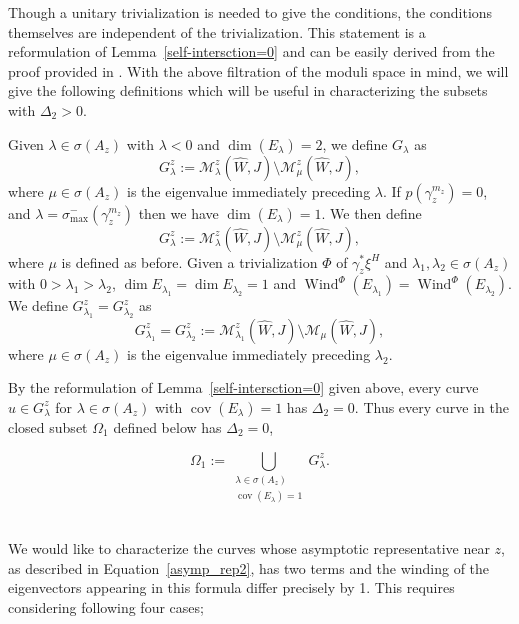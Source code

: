 \documentclass[11pt, a4paper]{amsart}
\newcommand{\cM}{\mathcal{M}}
\DeclareMathOperator{\wind}{Wind}
\DeclareMathOperator{\cov}{cov}
\begin{document}
Though a unitary trivialization is needed to give the conditions, the conditions themselves are independent of the trivialization. This statement is a reformulation of Lemma~\ref{self-intersction=0} and can be easily derived from the proof provided in \cite[Lemma~3.14]{Siefinter2009}. With the above filtration of the moduli space in mind, we will give the following definitions which will be useful in characterizing the subsets with $\Delta_2>0$.

\begin{definition}
Given $\lambda \in \sigma(A_{z})$ with $\lambda<0$ and $\dim(E_\lambda)=2$, we define $G_{\lambda}$ as 
$$G^z_{\lambda}:=\cM^z_{\lambda}(\widehat{W},J)\setminus \cM^z_{\mu}(\widehat{W},J),$$
where $\mu \in \sigma(A_z)$ is the eigenvalue immediately preceding $\lambda$. If $p(\gamma_z^{m_z})=0$, and $\lambda = \sigma_{\max}^-(\gamma_z^{m_z})$ then we have $\dim(E_\lambda)=1$. We then define 
$$G^z_{\lambda}:=\cM^z_{\lambda}(\widehat{W},J)\setminus \cM^z_{\mu}(\widehat{W},J),$$
where $\mu$ is defined as before.
Given a trivialization $\Phi$ of $\gamma_z^* \xi^{H}$ and $\lambda_1, \lambda_2 \in \sigma(A_z)$ with $0>\lambda_1 > \lambda_2$, $\dim{E_{\lambda_1}}=\dim{E_{\lambda_2}}=1$ and $\wind^{\Phi}(E_{\lambda_1})=\wind^{\Phi}(E_{\lambda_2})$. We define $G^z_{\lambda_1}=G^z_{\lambda_2}$ as
$$G^z_{\lambda_1}=G^z_{\lambda_2}:=\cM^z_{\lambda_1}(\widehat{W},J)\setminus \cM_{\mu}(\widehat{W},J),
$$ where $\mu \in \sigma(A_z)$ is the eigenvalue immediately preceding $\lambda_2$.
\end{definition}

By the reformulation of Lemma~\ref{self-intersction=0} given above, every curve $u \in G^z_{\lambda}$ for $\lambda \in \sigma(A_z)$ with $\cov(E_{\lambda})=1$ has $\Delta_2=0$. Thus every curve in the closed subset $\Omega_1$ defined below has $\Delta_2=0$,

$$\Omega_1:=\bigcup_{\substack{\lambda \in \sigma(A_z)\\ \cov(E_{\lambda})=1}} G^z_{\lambda}.$$\\
\vspace{1pt}

We would like to characterize the curves whose asymptotic representative near $z$, as described in Equation~\ref{asymp_rep2}, has two terms and the winding of the eigenvectors appearing in this formula differ precisely by 1. This requires considering following four cases;
\end{document}
